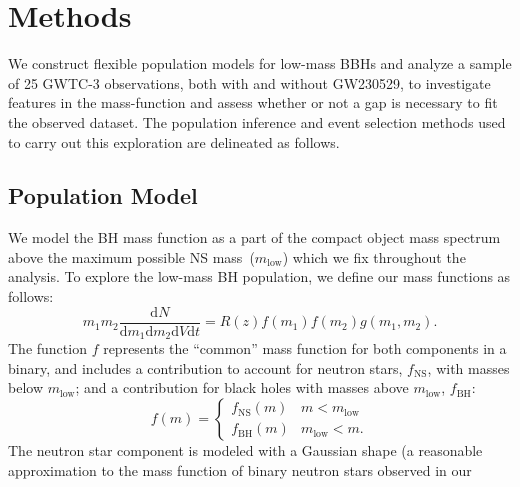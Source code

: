\documentclass[modern]{aastex631}
\newcommand{\dd}{\ensuremath{\mathrm{d}}}
\begin{document}
\section{Methods}
\label{sec:methods}
\noindent
We construct flexible population models for low-mass BBHs and analyze a sample of 25 GWTC-3 observations, both with and without GW230529, to investigate features in the mass-function and assess whether or not a gap is necessary to fit the observed dataset. The population inference and event selection methods used to carry out this exploration are delineated as follows.
\subsection{Population Model}
\noindent
We model the BH mass function as a part of the compact object mass spectrum
above the maximum possible NS mass~($m_\mathrm{low}$) which we fix throughout
the analysis. To explore the low-mass BH population, we define our mass
functions as follows:
\begin{equation}
    \label{eq:intensity-definition}
    m_1 m_2 \frac{\dd N}{\dd m_1 \dd m_2 \dd V \dd t} = R(z) f\left( m_1 \right) f\left( m_2 \right) g(m_1, m_2).
\end{equation}
\noindent
The function $f$ represents the ``common'' mass function for both components in
a binary, and includes a contribution to account for neutron stars,
$f_\mathrm{NS}$, with masses below $m_\mathrm{low}$; and a contribution for
black holes with masses above $m_\mathrm{low}$, $f_\mathrm{BH}$:
\begin{equation}
    f(m) = \begin{cases}
        f_\mathrm{NS}(m) & m < m_\mathrm{low} \\
        f_\mathrm{BH}(m) & m_\mathrm{low} < m.
    \end{cases}
\end{equation}
The neutron star component is modeled with a Gaussian shape (a reasonable
approximation to the mass function of binary neutron stars observed in our
\end{document}
